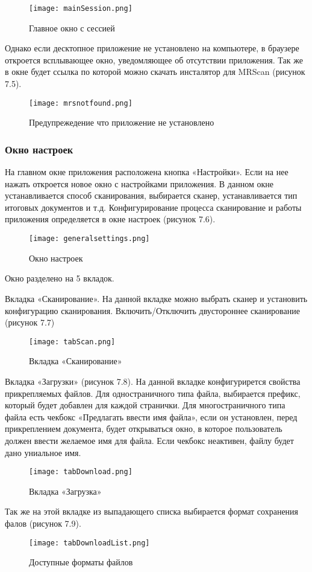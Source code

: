 \begin{figure}[h!]
\centering
	\texttt{[image: mainSession.png]}
	\caption{Главное окно с сессией}
	\clearpage
\end{figure}

Однако если десктопное приложение не установлено на компьютере, в браузере откроется всплывающее окно, уведомляющее об отсутствии приложения. Так же в окне будет ссылка по которой можно скачать инсталятор для MRScan (рисунок 7.5).

\begin{figure}[h!]
\centering
	\texttt{[image: mrsnotfound.png]}
	\caption{Предупрежедение что приложение не установлено}
	\clearpage
\end{figure}

\subsubsection{Окно настроек}

На главном окне приложения расположена кнопка «Настройки». Если на нее нажать откроется новое окно с настройками приложения. В данном окне устанавливается способ сканирования, выбирается сканер, устанавливается тип итоговых документов и т.д. Конфигурирование процесса сканирование и работы приложения определяется в окне настроек (рисунок 7.6).

\begin{figure}[h!]
\centering
	\texttt{[image: generalsettings.png]}
	\caption{Окно настроек}
	\clearpage
\end{figure}

Окно разделено на 5 вкладок.

Вкладка «Сканирование». На данной вкладке можно выбрать сканер и установить конфигурацию сканирования. Включить/Отключить двустороннее сканирование (рисунок 7.7)

\begin{figure}[h!]
\centering
	\texttt{[image: tabScan.png]}
	\caption{Вкладка «Сканирование»}
	\clearpage
\end{figure}

Вкладка «Загрузки»  (рисунок 7.8). На данной вкладке конфигурирется свойства прикрепляемых файлов. Для одностраничного типа файла, выбирается префикс, который будет добавлен для каждой странички. Для многостраничного типа файла есть чекбокс «Предлагать ввести имя файла», если он установлен, перед прикреплением документа, будет открываться окно, в которое пользователь должен ввести желаемое имя для файла. Если чекбокс неактивен, файлу будет дано униальное имя. 

\begin{figure}[h!]
\centering
	\texttt{[image: tabDownload.png]}
	\caption{Вкладка «Загрузка»}
	\clearpage
\end{figure}

Так же на этой вкладке из выпадающего списка выбирается формат сохранения фалов (рисунок 7.9).

\begin{figure}[h!]
\centering
	\texttt{[image: tabDownloadList.png]}
	\caption{Доступные форматы файлов}
	\clearpage
\end{figure}

